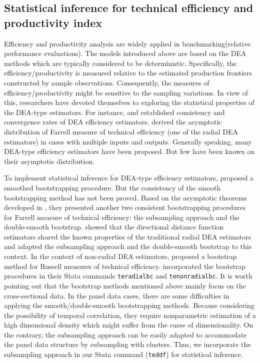 \subsection{Statistical inference for technical efficiency and productivity index}

Efficiency and productivity analysis are widely applied in benchmarking(relative performance evaluations). The models introduced above are based on the DEA methods which are typically considered to be deterministic. Specifically, the efficiency/productivity is measured relative to the estimated production frontiers constructed by sample observations. Consequently, the measures of efficiency/productivity might be sensitive to the sampling variations. In view of this, researchers have devoted themselves to exploring the statistical properties of the DEA-type estimators. For instance, \cite{banker1993} and \cite{Kneip1998} established consistency and convergence rates of DEA efficiency estimators. \cite{kneip2008} derived the asymptotic distribution of Farrell measure of technical efficiency (one of the radial DEA estimators) in cases with multiple inputs and outputs. Generally speaking, many DEA-type efficiency estimators have been proposed. But few have been known on their asymptotic distribution. 

To implement statistical inference for DEA-type efficiency estimators, \cite{Simar1998} proposed a smoothed bootstrapping procedure. But the consistency of the smooth bootstrapping method has not been proved. Based on the asymptotic theorems developed in \cite{kneip2008}, they presented another two consistent bootstrapping procedures for Farrell measure of technical efficiency: the subsampling approach and the double-smooth bootstrap. \cite{simar2012} showed that the directional distance function estimators shared the known properties of the traditional radial DEA estimators and adapted the subsampling approach and the double-smooth bootstrap to this context. In the context of non-radial DEA estimators, \cite{Badunenko2020} proposed a bootstrap method for Russell measures of technical efficiency. \cite{Badunenko2016} incorporated the bootstrap procedures in their Stata commands {\tt teradialbc} and {\tt tenonradialbc}. It is worth pointing out that the bootstrap methods mentioned above mainly focus on the cross-sectional data. In the panel data cases, there are some difficulties in applying the smooth/double-smooth bootstrapping methods. Because considering the possibility of temporal correlation, they require nonparametric estimation of a high dimensional density which might suffer from the curse of dimensionality. On the contrary, the subsampling approach can be easily adapted to accommodate the panel data structure by subsampling with clusters. Thus, we incorporate the subsampling approach in our Stata command ({\tt teddf}) for statistical inference.

